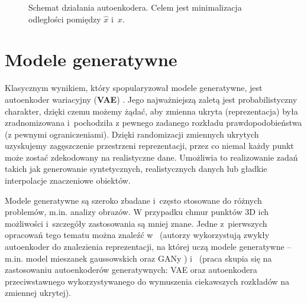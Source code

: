 \documentclass{iithesis}
\begin{document}
\begin{figure}[b]
    \caption{\label{fig:ae_basics} Schemat działania autoenkodera. Celem jest minimalizacja odległości
    pomiędzy $\hat{x}$ i~$x$.}
\end{figure}

\section{Modele generatywne}
Klasycznym wynikiem, który spopularyzował modele generatywne, jest autoenkoder wariacyjny
(\textbf{VAE}) \cite{vae}. Jego najważniejszą zaletą jest probabilistyczny charakter,
dzięki czemu możemy żądać, aby zmienna ukryta (reprezentacja) była zradnomizowana i~pochodziła
z pewnego zadanego rozkładu prawdopodobieństwa (z pewnymi ograniczeniami).
Dzięki randomizacji zmiennych ukrytych uzyskujemy zagęszczenie przestrzeni reprezentacji,
przez co niemal każdy punkt może zostać zdekodowany na realistyczne dane.
Umożliwia to realizowanie zadań takich jak generowanie syntetycznych,
realistycznych danych lub gładkie interpolacje znaczeniowe obiektów.

Modele generatywne są szeroko zbadane i~często stosowane do różnych problemów, m.in. analizy obrazów.
W przypadku chmur punktów 3D ich możliwości i~szczegóły zastosowania są mniej znane.
Jedne z~pierwszych opracowań tego tematu można znaleźć w~\cite{pc_representations}
(autorzy wykorzystują zwykły autoenkoder do znalezienia reprezentacji,
na której uczą modele generatywne -- m.in. model mieszanek gaussowskich oraz GANy \cite{gan})
i~\cite{adversarial} (praca skupia się na zastosowaniu autoenkoderów generatywnych: VAE oraz
autoenkodera przeciwstawnego wykorzystywanego do wymuszenia ciekawszych rozkładów na zmiennej ukrytej).
\end{document}
